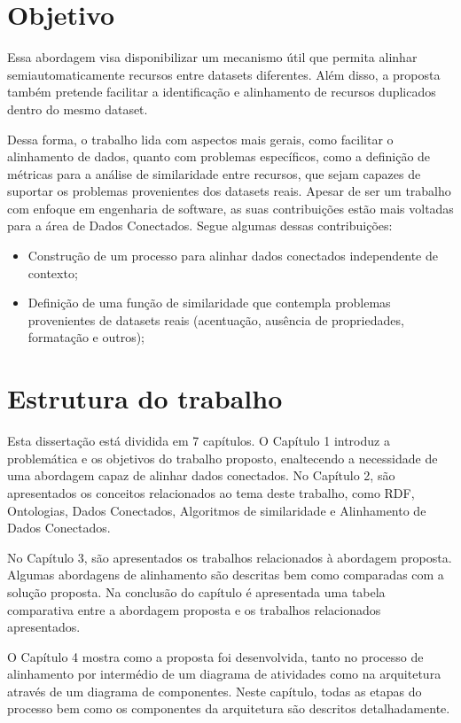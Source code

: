 \section{Objetivo}

Essa abordagem visa disponibilizar um mecanismo útil que permita alinhar semiautomaticamente recursos entre datasets diferentes. Além disso, a proposta também pretende facilitar a identificação e alinhamento de recursos duplicados dentro do mesmo dataset.

Dessa forma, o trabalho lida com aspectos mais gerais, como facilitar o alinhamento de dados, quanto com problemas específicos, como a definição de métricas para a análise de similaridade entre recursos, que sejam capazes de suportar os problemas provenientes dos datasets reais. Apesar de ser um trabalho com enfoque em engenharia de software, as suas contribuições estão mais voltadas para a área de Dados Conectados. Segue algumas dessas contribuições:

\begin{itemize}
	\item Construção de um processo para alinhar dados conectados independente de contexto;
	\item Definição de uma função de similaridade que contempla problemas provenientes de datasets reais (acentuação, ausência de propriedades, formatação e outros);
\end{itemize}

\section{Estrutura do trabalho}

Esta dissertação está dividida em 7 capítulos. O Capítulo 1 introduz a problemática e os objetivos do trabalho proposto, enaltecendo a necessidade de uma abordagem capaz de alinhar dados conectados. No Capítulo 2, são apresentados os conceitos relacionados ao tema deste trabalho, como RDF, Ontologias, Dados Conectados, Algoritmos de similaridade e Alinhamento de Dados Conectados.

No Capítulo 3, são apresentados os trabalhos relacionados à abordagem proposta. Algumas abordagens de alinhamento são descritas bem como comparadas com a solução proposta. Na conclusão do capítulo é apresentada uma tabela comparativa entre a abordagem proposta e os trabalhos relacionados apresentados.

O Capítulo 4 mostra como a proposta foi desenvolvida, tanto no processo de alinhamento por intermédio de um diagrama de atividades como na arquitetura através de um diagrama de componentes. Neste capítulo, todas as etapas do processo bem como os componentes da arquitetura são descritos detalhadamente.

